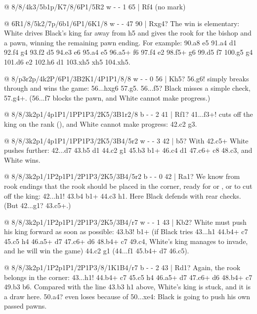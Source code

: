 @ 8/8/4k3/5b1p/K7/8/6P1/5R2 w - - 1 65 | Rf4 (no mark)

@ 6R1/8/5k2/7p/6b1/6P1/6K1/8 w - - 47 90 | Rxg4?
The win is elementary: White drives Black's king far away from h5 and gives the rook for the bishop and a pawn, winning the remaining pawn ending. For example: 90.\R a8 \K e5 91.\R a4 \B d1 92.\R f4 \B g4 93.\K f2 \K d5 94.\K e3 \K e6 95.\R a4 \K e5 96.\R a5+ \K f6 97.\K f4 \B e2 98.\R f5+ \K g6 99.\R d5 \K f7 100.\K g5 \B g4 101.\R d6 \B e2 102.\R h6 \B d1 103.\R xh5 \B xh5 104.\K xh5.

@ 8/p3r2p/4k2P/6P1/3B2K1/4P1P1/8/8 w - - 0 56 | Kh5?
56.g6! simply breaks through and wins the game: 56...hxg6 57.\K g5. 56...\K f5? Black misses a simple check, 57.g4+. (56...\K f7 blocks the pawn, and White cannot make progress.)

@ 8/8/3k2p1/4p1P1/1PP1P3/2K5/3B1r2/8 b - - 2 41 | Rf1?
41...\R f3+! cuts off the king on the rank (), and White cannot make progress: 42.\K c2 \R g3.

@ 8/8/3k2p1/4p1P1/1PP1P3/2K5/3B4/5r2 w - - 3 42 | b5?
With 42.c5+ White pushes further: 42...\K d7 43.b5 \R d1 44.\K c2 \R g1 45.\K b3 \R b1+ 46.\K c4 \R d1 47.c6+ \K c8 48.\B c3, and White wins.

@ 8/8/3k2p1/1P2p1P1/2P1P3/2K5/3B4/5r2 b - - 0 42 | Ra1?
We know from rook endings that the rook should be placed in the corner, ready for  or , or to cut off the king: 42...\R h1! 43.\K b4 \R b1+ 44.\K c3 \R h1. Here Black defends with rear checks. (But 42...\R g1? 43.c5+.)

@ 8/8/3k2p1/1P2p1P1/2P1P3/2K5/3B4/r7 w - - 1 43 | Kb2?
White must push his king forward as soon as possible: 43.\K b3! \R b1+ (if Black tries 43...\R h1
44.\B b4+ \K c7 45.c5 \R h4 46.\B a5+ \K d7 47.c6+ \K d6 48.\B b4+ \K c7 49.\K c4, White's king
manages to invade, and he will win the game) 44.\K c2 \R g1 (44...\R f1 45.\B b4+ \K d7 46.c5).

@ 8/8/3k2p1/1P2p1P1/2P1P3/8/1K1B4/r7 b - - 2 43 | Rd1?
Again, the rook belongs in the corner: 43...\R h1! 44.\B b4+ \K c7 45.c5 \R h4 46.\B a5+ \K d7
47.c6+ \K d6 48.\B b4+ \K c7 49.\K b3 \K b6. Compared with the line 43.\K b3 \R h1 above, White's
king is stuck, and it is a draw here. 50.\K a4? even loses because of 50...\R xe4: Black is going to
push his own passed pawns.

